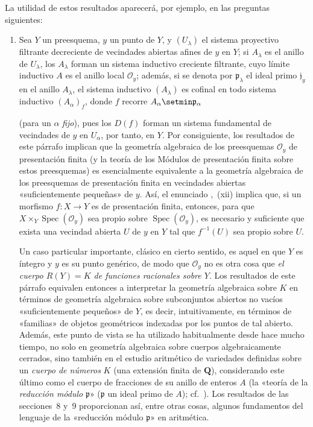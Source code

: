 \begin{env}[8.1.2]
La utilidad de estos resultados aparecerá, por ejemplo, en las preguntas siguientes:
\begin{enumerate}[label=\emph{\alph*)}]
  \item
  Sea $Y$ un preesquema, $y$ un punto de $Y$, y $(U_\lambda)$ el sistema proyectivo filtrante decreciente de vecindades abiertas afines de $y$ en $Y$; si $A_\lambda$ es el anillo de $U_\lambda$, los $A_\lambda$ forman un sistema inductivo creciente filtrante, cuyo límite inductivo $A$ es el anillo local $\mathcal O_y$; además, si se denota por $\mathfrak p_\lambda$ el ideal primo $\mathfrak j_y$ en el anillo $A_\lambda$, el sistema inductivo $(A_\lambda)$ es cofinal en todo sistema inductivo $(A_\alpha)_f$, donde $f$ recorre $A_\alpha\setmin\mathfrak p_\alpha$

(para un $\alpha$ \emph{fijo}), pues los $D(f)$ forman un sistema fundamental de vecindades de $y$ en $U_\alpha$,
por tanto, en $Y$.
Por consiguiente, los resultados de este párrafo implican que la geometría algebraica de los preesquemas $\mathcal O_y$ de presentación finita (y la teoría de los Módulos de presentación finita sobre estos preesquemas) es esencialmente equivalente a la geometría algebraica de los preesquemas de presentación finita en vecindades abiertas «suficientemente pequeñas» de $y$.
Así, el enunciado ,~(xii) implica que, si un morfismo $f:X\to Y$ es de presentación finita, entonces, para que $X\times_Y\operatorname{Spec}(\mathcal O_y)$ sea propio sobre $\operatorname{Spec}(\mathcal O_y)$, es necesario y suficiente que exista una vecindad abierta $U$ de $y$ en $Y$ tal que $f^{-1}(U)$ sea propio sobre $U$.

Un caso particular importante, clásico en cierto sentido, es aquel en que $Y$ es íntegro y $y$ es su punto genérico, de modo que $\mathcal O_y$ no es otra cosa que \emph{el cuerpo $R(Y)=K$ de funciones racionales sobre $Y$}.
Los resultados de este párrafo equivalen entonces a interpretar la geometría algebraica sobre $K$ en términos de geometría algebraica sobre subconjuntos abiertos no vacíos «suficientemente pequeños» de $Y$, es decir, intuitivamente, en términos de «familias» de objetos geométricos indexadas por los puntos de tal abierto.
Además, este punto de vista se ha utilizado habitualmente desde hace mucho tiempo, no solo en geometría algebraica sobre cuerpos algebraicamente cerrados, sino también en el estudio aritmético de variedades definidas sobre un \emph{cuerpo de números} $K$ (una extensión finita de $\mathbf Q$), considerando este último como el cuerpo de fracciones de su anillo de enteros $A$ (la «teoría de la \emph{reducción módulo} $\mathfrak p$» ($\mathfrak p$ un ideal primo de $A$); cf.\ ).
Los resultados de las secciones \textsection\textsection\,8 y~9 proporcionan así, entre otras cosas, algunos fundamentos del lenguaje de la «reducción módulo $\mathfrak p$» en aritmética.


\end{enumerate}
\end{env}
